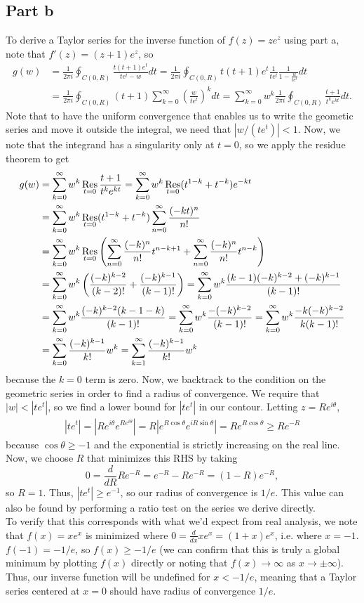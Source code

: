 \documentclass{article}
\begin{document}
\subsection{Part b}
To derive a Taylor series for the inverse function of $f(z)=ze^z$ using part a, note that $f'(z)=(z+1)e^z$, so
\begin{align*}
g(w)&=\frac{1}{2\pi i}\oint_{C(0,R)}\frac{t (t+1)e^t}{te^t-w}dt=\frac{1}{2\pi i}\oint_{C(0,R)}t (t+1)e^t\frac{1}{te^t}\frac{1}{1-\frac{w}{te^t}}dt\\&=
\frac{1}{2\pi i}\oint_{C(0,R)}(t+1)\sum_{k=0}^\infty\left(\frac{w}{te^t}\right)^kdt=\sum_{k=0}^\infty w^k\frac{1}{2\pi i}\oint_{C(0,R)}\frac{t+1}{t^ke^{kt}}dt.
\end{align*}
Note that to have the uniform convergence that enables us to write the geometic series and move it outside the integral, we need that $|w/(te^t)|<1$. Now, we note that the integrand has a singularity only at $t=0$, so we apply the residue theorem to get
\begin{align*}
g(w)&=\sum_{k=0}^\infty w^k\operatorname*{Res}_{t=0}\frac{t+1}{t^ke^{kt}}=\sum_{k=0}^\infty w^k\operatorname*{Res}_{t=0}(t^{1-k}+t^{-k})e^{-kt}\\&=
\sum_{k=0}^\infty w^k\operatorname*{Res}_{t=0}(t^{1-k}+t^{-k})\sum_{n=0}^\infty\frac{(-kt)^n}{n!}\\&=\sum_{k=0}^\infty w^k\operatorname*{Res}_{t=0}\left(\sum_{n=0}^\infty\frac{(-k)^n}{n!}t^{n-k+1}+\sum_{n=0}^\infty\frac{(-k)^n}{n!}t^{n-k}\right)\\&=
\sum_{k=0}^\infty w^k\left(\frac{(-k)^{k-2}}{(k-2)!}+\frac{(-k)^{k-1}}{(k-1)!}\right)=\sum_{k=0}^\infty w^k\frac{(k-1)(-k)^{k-2}+(-k)^{k-1}}{(k-1)!}\\&=
\sum_{k=0}^\infty w^k\frac{(-k)^{k-2}(k-1-k)}{(k-1)!}=\sum_{k=0}^\infty w^k\frac{-(-k)^{k-2}}{(k-1)!}=\sum_{k=0}^\infty w^k\frac{-k(-k)^{k-2}}{k(k-1)!}\\&=\sum_{k=0}^\infty \frac{(-k)^{k-1}}{k!}w^k=\sum_{k=1}^\infty \frac{(-k)^{k-1}}{k!}w^k
\end{align*}
because the $k=0$ term is zero. Now, we backtrack to the condition on the geometric series in order to find a radius of convergence. We require that $|w|<|te^t|$, so we find a lower bound for $|te^t|$ in our contour. Letting $z=Re^{i\theta}$,
\begin{align*}
|te^t|=\left|Re^{i\theta}e^{Re^{i\theta}}\right|=R|e^{R\cos\theta}e^{iR\sin\theta}|=Re^{R\cos\theta}\geq Re^{-R}
\end{align*}
because $\cos\theta\geq-1$ and the exponential is strictly increasing on the real line. Now, we choose $R$ that minimizes this RHS by taking 
\[
0=\frac{d}{dR}Re^{-R}=e^{-R}-Re^{-R}=(1-R)e^{-R},
\]
so $R=1$. Thus, $|te^t|\geq e^{-1}$, so our radius of convergence is $1/e$. This value can also be found by performing a ratio test on the series we derive directly. \\
To verify that this corresponds with what we'd expect from real analysis, we note that $f(x)=xe^x$ is minimized where $0=\frac{d}{dx}xe^x=(1+x)e^x$, i.e. where $x=-1$. $f(-1)=-1/e$, so $f(x)\geq-1/e$ (we can confirm that this is truly a global minimum by plotting $f(x)$ directly or noting that $f(x)\to\infty$ as $x\to\pm\infty$). Thus, our inverse function will be undefined for $x<-1/e$, meaning that a Taylor series centered at $x=0$ should have radius of convergence $1/e$. 
\end{document}
